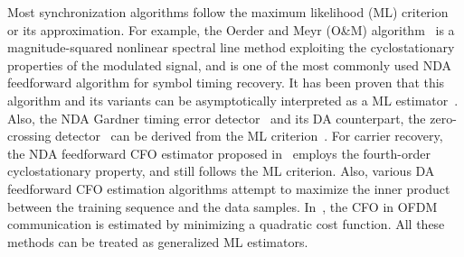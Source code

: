 \documentclass[12pt, draftclsnofoot, onecolumn]{IEEEtran}
\begin{document}



Most synchronization algorithms follow the maximum likelihood (ML) criterion or its approximation.
For example, the Oerder and Meyr (O\&M) algorithm~\cite{Oerder1988} is a magnitude-squared nonlinear spectral line method exploiting the cyclostationary properties of the modulated signal, 
and is one of the most commonly used NDA feedforward algorithm for symbol timing recovery.
It has been proven that this algorithm and its variants can be asymptotically interpreted as a ML estimator~\cite{YanWang2002,Lopez-Salcedo2006}.
Also, the NDA Gardner timing error detector~\cite{Gardner1986} and its DA counterpart, the zero-crossing detector~\cite{gardner1988demodulator} can be derived from the ML criterion~\cite{Oerder1987}.
For carrier recovery, the NDA feedforward CFO estimator proposed in~\cite{Wang2004} employs the fourth-order cyclostationary property, and still follows the ML criterion.
Also, various DA feedforward CFO estimation algorithms attempt to maximize the inner product between the  training sequence and the data samples.
In~\cite{Li2008,Amar2017},
% 
% 
the CFO in OFDM communication is estimated by minimizing a quadratic cost function.
All these methods can be treated as generalized ML estimators.
\end{document}
